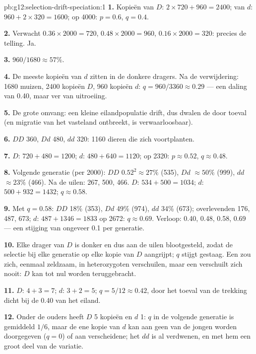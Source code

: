 \begin{solution}{pb:g12:selection-drift-speciation:1}
\textbf{1.} Kopieën van $D$: $2 \times 720 + 960 = 2400$; van $d$: $960 +
2 \times 320 = 1600$; op 4000: $p = 0.6$, $q = 0.4$.

\textbf{2.} Verwacht $0.36 \times 2000 = 720$, $0.48 \times 2000 =
960$, $0.16 \times 2000 = 320$: precies de telling. Ja.

\textbf{3.} $960/1680 \approx 57\%$.

\textbf{4.} De meeste kopieën van $d$ zitten in de donkere dragers. Na de
verwijdering: 1680 muizen, 2400 kopieën $D$, 960 kopieën $d$: $q = 960/3360 \approx
0.29$ --- een daling van 0.40, maar ver van uitroeiing.

\textbf{5.} De grote omvang: een kleine eilandpopulatie drift, dus dwalen
de  door toeval (en migratie van het vasteland ontbreekt,
 is verwaarloosbaar).

\textbf{6.} $DD$ 360, $Dd$ 480, $dd$ 320: 1160 dieren die zich voortplanten.

\textbf{7.} $D$: $720 + 480 = 1200$; $d$: $480 + 640 = 1120$; op 2320:
$p \approx 0.52$, $q \approx 0.48$.

\textbf{8.} Volgende generatie (per 2000): $DD$ $0.52^2 \approx 27\%$
(535), $Dd$ $\approx 50\%$ (999), $dd$ $\approx 23\%$ (466). Na de uilen:
267, 500, 466. $D$: $534 + 500 = 1034$; $d$: $500 + 932 =
1432$; $q \approx 0.58$.

\textbf{9.} Met $q = 0.58$: $DD$ 18\% (353), $Dd$ 49\% (974), $dd$ 34\%
(673); overlevenden 176, 487, 673; $d$: $487 + 1346 = 1833$ op 2672:
$q \approx 0.69$. Verloop: 0.40, 0.48, 0.58, 0.69 --- een stijging van
ongeveer 0.1 per generatie.

\textbf{10.} Elke drager van $D$ is donker en dus aan de uilen
blootgesteld, zodat de selectie bij elke generatie op elke kopie van $D$
aangrijpt; $q$ stijgt gestaag. Een   zou zich, eenmaal
zeldzaam, in heterozygoten verschuilen, maar een  
verschuilt zich nooit: $D$ kan tot nul worden teruggebracht.

\textbf{11.} $D$: $4 + 3 = 7$; $d$: $3 + 2 = 5$; $q = 5/12 \approx
0.42$, door het toeval van de trekking dicht bij de 0.40 van het eiland.

\textbf{12.} Onder de ouders heeft $D$ 5 kopieën en $d$ 1: $q$ in de
volgende generatie is gemiddeld $1/6$, maar de ene kopie van $d$ kan aan
geen van de jongen worden doorgegeven ($q = 0$) of aan verscheidene; het
 $dd$ is al verdwenen, en met hem een groot deel van de variatie.


\end{solution}
